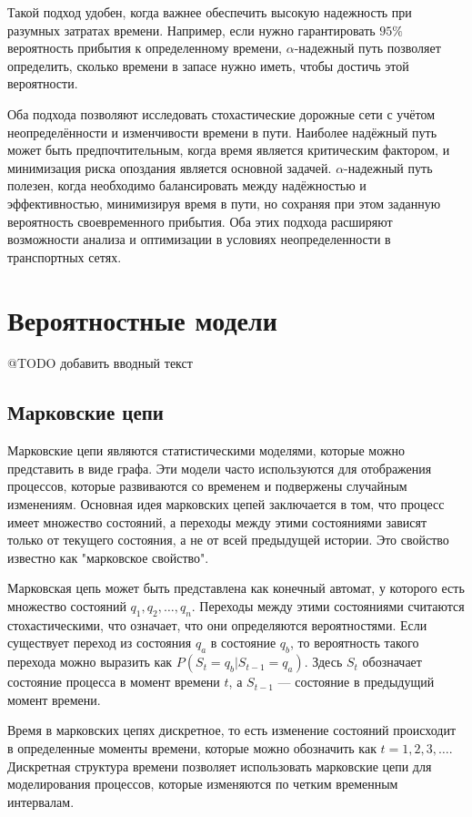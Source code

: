 Такой подход удобен, когда важнее обеспечить высокую надежность при разумных затратах времени. Например, если нужно гарантировать $95\%$ вероятность прибытия к определенному времени, $\alpha$-надежный путь позволяет определить, сколько времени в запасе нужно иметь, чтобы достичь этой вероятности.

Оба подхода позволяют исследовать стохастические дорожные сети с учётом неопределённости и изменчивости времени в пути. Наиболее надёжный путь может быть предпочтительным, когда время является критическим фактором, и минимизация риска опоздания является основной задачей. $\alpha$-надежный путь полезен, когда необходимо балансировать между надёжностью и эффективностью, минимизируя время в пути, но сохраняя при этом заданную вероятность своевременного прибытия. Оба этих подхода расширяют возможности анализа и оптимизации в условиях неопределенности в транспортных сетях.



\section{Вероятностные модели}

@TODO добавить вводный текст

\subsection{Марковские цепи}


Марковские цепи являются статистическими моделями, которые можно представить в виде графа. Эти модели часто используются для отображения процессов, которые развиваются со временем и подвержены случайным изменениям. Основная идея марковских цепей заключается в том, что процесс имеет множество состояний, а переходы между этими состояниями зависят только от текущего состояния, а не от всей предыдущей истории. Это свойство известно как "марковское свойство".

Марковская цепь может быть представлена как конечный автомат, у которого есть множество состояний $q_1, q_2, \ldots, q_n$. Переходы между этими состояниями считаются стохастическими, что означает, что они определяются вероятностями. Если существует переход из состояния $q_a$ в состояние $q_b$, то вероятность такого перехода можно выразить как $P(S_t = q_b | S_{t - 1} = q_a)$. Здесь $S_t$ обозначает состояние процесса в момент времени $t$, а $S_{t - 1}$ — состояние в предыдущий момент времени.

Время в марковских цепях дискретное, то есть изменение состояний происходит в определенные моменты времени, которые можно обозначить как $t = 1, 2, 3, \ldots$. Дискретная структура времени позволяет использовать марковские цепи для моделирования процессов, которые изменяются по четким временным интервалам.

